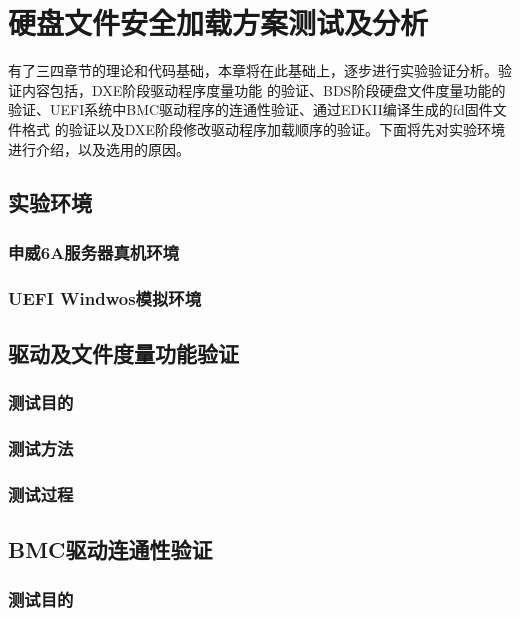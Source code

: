 %
%
\chapter{硬盘文件安全加载方案测试及分析}
\label{cha:test}
有了三四章节的理论和代码基础，本章将在此基础上，逐步进行实验验证分析。验证内容包括，DXE阶段驱动程序度量功能
的验证、BDS阶段硬盘文件度量功能的验证、UEFI系统中BMC驱动程序的连通性验证、通过EDKII编译生成的fd固件文件格式
的验证以及DXE阶段修改驱动程序加载顺序的验证。下面将先对实验环境进行介绍，以及选用的原因。

%
%
\section{实验环境}

\subsection{申威6A服务器真机环境}

\subsection{UEFI Windwos模拟环境}

%
%
\section{驱动及文件度量功能验证}

\subsection{测试目的}

\subsection{测试方法}

\subsection{测试过程}

%
%
\section{BMC驱动连通性验证}

\subsection{测试目的}

